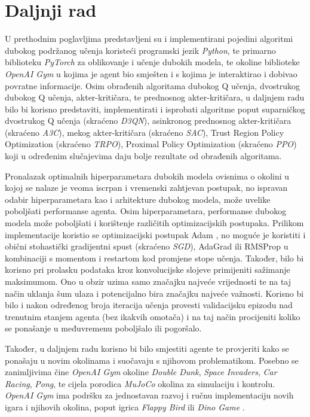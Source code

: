 \chapter{Daljnji rad}

U prethodnim poglavljima predstavljeni su i implementirani pojedini algoritmi dubokog podržanog učenja koristeći programski jezik \textit{Python}, te primarno biblioteku \textit{PyTorch} za oblikovanje i učenje dubokih modela, te okoline biblioteke \textit{OpenAI Gym} u kojima je agent bio smješten i s kojima je interaktirao i dobivao povratne informacije. Osim obrađenih algoritama dubokog Q učenja, dvostrukog dubokog Q učenja, akter-kritičara, te prednosnog akter-kritičara, u daljnjem radu bilo bi korisno predstaviti, implementirati i isprobati algoritme poput suparničkog dvostrukog Q učenja  (skraćeno \textit{D3QN}), asinkronog prednosnog akter-kritičara  (skraćeno \textit{A3C}), mekog akter-kritičara  (skraćeno \textit{SAC}), Trust Region Policy Optimization (skraćeno \textit{TRPO}), Proximal Policy Optimization (skraćeno \textit{PPO}) koji u određenim slučajevima daju bolje rezultate od obrađenih algoritama.

Pronalazak optimalnih hiperparametara dubokih modela ovisnima o okolini u kojoj se nalaze je veoma iscrpan i vremenski zahtjevan postupak, no ispravan odabir hiperparametara kao i arhitekture dubokog modela, može uvelike poboljšati performanse agenta. Osim hiperparametara, performanse dubokog modela može poboljšati i korištenje različitih optimizacijskih postupaka. Prilikom implementacije koristio se optimizacijski postupak Adam , no moguće je koristiti i obični stohastički gradijentni spust  (skraćeno \textit{SGD}), AdaGrad ili RMSProp u kombinaciji s momentom i restartom kod promjene stope učenja. Također, bilo bi korisno pri prolasku podataka kroz konvolucijske slojeve primijeniti sažimanje maksimumom. Ono u obzir uzima samo značajku najveće vrijednosti te na taj način uklanja šum ulaza i potencijalno bira značajku najveće važnosti. Korisno bi bilo i nakon određenog broja iteracija učenja provesti validacijsku epizodu nad trenutnim stanjem agenta (bez ikakvih omotača) i na taj način procijeniti koliko se ponašanje u međuvremenu poboljšalo ili pogoršalo.

Također, u daljnjem radu korisno bi bilo smjestiti agente te provjeriti kako se ponašaju u novim okolinama i suočavaju s njihovom problematikom. Posebno se zanimljivima čine \textit{OpenAI Gym} okoline \textit{Double Dunk}, \textit{Space Invaders}, \textit{Car Racing}, \textit{Pong}, te cijela porodica \textit{MuJoCo} okolina za simulaciju i kontrolu. \textit{OpenAI Gym} ima podršku za jednostavan razvoj i ručnu implementaciju novih igara i njihovih okolina, poput igrica \textit{Flappy Bird} \cite{CustomFlappyBird} ili \textit{Dino Game} \cite{CustomDinoGame}.

